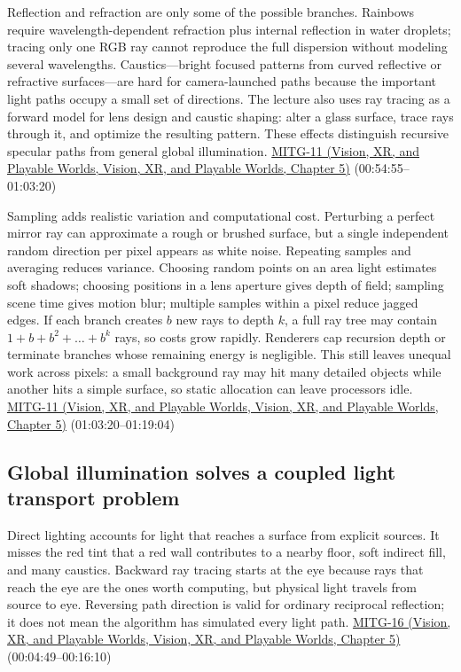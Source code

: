Reflection and refraction are only some of the possible branches. Rainbows require wavelength-dependent refraction plus internal reflection in water droplets; tracing only one RGB ray cannot reproduce the full dispersion without modeling several wavelengths. Caustics---bright focused patterns from curved reflective or refractive surfaces---are hard for camera-launched paths because the important light paths occupy a small set of directions. The lecture also uses ray tracing as a forward model for lens design and caustic shaping: alter a glass surface, trace rays through it, and optimize the resulting pattern. These effects distinguish recursive specular paths from general global illumination. \href{../07-Vision-XR-and-Playable-Worlds/main.pdf\#nameddest=04-visual-computing-ii-ch036-mitg-11---ray-tracing}{MITG-11 (Vision, XR, and Playable Worlds, Vision, XR, and Playable Worlds, Chapter 5)} (00:54:55--01:03:20)

Sampling adds realistic variation and computational cost. Perturbing a perfect mirror ray can approximate a rough or brushed surface, but a single independent random direction per pixel appears as white noise. Repeating samples and averaging reduces variance. Choosing random points on an area light estimates soft shadows; choosing positions in a lens aperture gives depth of field; sampling scene time gives motion blur; multiple samples within a pixel reduce jagged edges. If each branch creates \(b\) new rays to depth \(k\), a full ray tree may contain \(1+b+b^2+\dots+b^k\) rays, so costs grow rapidly. Renderers cap recursion depth or terminate branches whose remaining energy is negligible. This still leaves unequal work across pixels: a small background ray may hit many detailed objects while another hits a simple surface, so static allocation can leave processors idle. \href{../07-Vision-XR-and-Playable-Worlds/main.pdf\#nameddest=04-visual-computing-ii-ch036-mitg-11---ray-tracing}{MITG-11 (Vision, XR, and Playable Worlds, Vision, XR, and Playable Worlds, Chapter 5)} (01:03:20--01:19:04)

\subsection{Global illumination solves a coupled light transport problem}\label{03-visual-computing-i-ch011-global-illumination-solves-a-coupled-light-transport-problem}

Direct lighting accounts for light that reaches a surface from explicit sources. It misses the red tint that a red wall contributes to a nearby floor, soft indirect fill, and many caustics. Backward ray tracing starts at the eye because rays that reach the eye are the ones worth computing, but physical light travels from source to eye. Reversing path direction is valid for ordinary reciprocal reflection; it does not mean the algorithm has simulated every light path. \href{../07-Vision-XR-and-Playable-Worlds/main.pdf\#nameddest=04-visual-computing-ii-ch036-mitg-16---global-illumination}{MITG-16 (Vision, XR, and Playable Worlds, Vision, XR, and Playable Worlds, Chapter 5)} (00:04:49--00:16:10)

